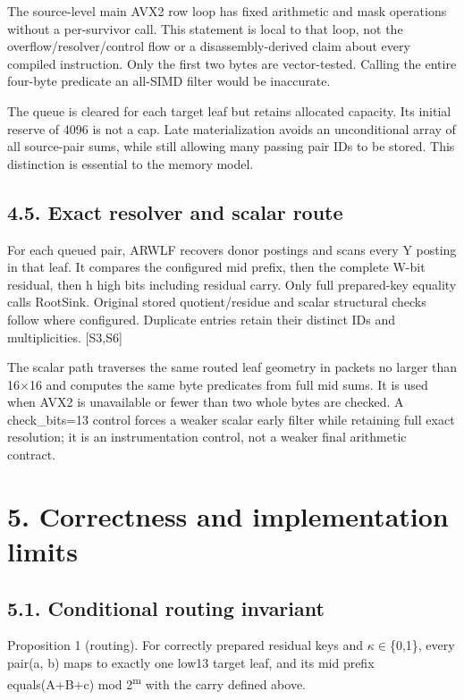 \documentclass[10pt,letterpaper]{article}
\begin{document}
The source-level main AVX2 row loop has fixed arithmetic and mask operations without a per-survivor call. This statement is local to that loop, not the overflow/resolver/control flow or a disassembly-derived claim about every compiled instruction. Only the first two bytes are vector-tested. Calling the entire four-byte predicate an all-SIMD filter would be inaccurate.


The queue is cleared for each target leaf but retains allocated capacity. Its initial reserve of 4096 is not a cap. Late materialization avoids an unconditional array of all source-pair sums, while still allowing many passing pair IDs to be stored. This distinction is essential to the memory model.


\subsection*{4.5. Exact resolver and scalar route}

For each queued pair, ARWLF recovers donor postings and scans every Y posting in that leaf. It compares the configured mid prefix, then the complete W-bit residual, then h high bits including residual carry. Only full prepared-key equality calls RootSink. Original stored quotient/residue and scalar structural checks follow where configured. Duplicate entries retain their distinct IDs and multiplicities. [S3,S6]


The scalar path traverses the same routed leaf geometry in packets no larger than 16\ensuremath{\times}16 and computes the same byte predicates from full mid sums. It is used when AVX2 is unavailable or fewer than two whole bytes are checked. A check\_bits=13 control forces a weaker scalar early filter while retaining full exact resolution; it is an instrumentation control, not a weaker final arithmetic contract.


\section*{5. Correctness and implementation limits}

\subsection*{5.1. Conditional routing invariant}

Proposition 1 (routing). For correctly prepared residual keys and \ensuremath{\kappa}\ensuremath{\in}\{0,1\}, every pair(a, b) maps to exactly one low13 target leaf, and its mid prefix equals(A+B+c) mod 2\textsuperscript{m} with the carry defined above.
\end{document}

